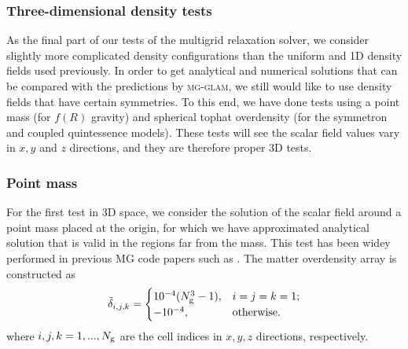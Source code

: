 \subsubsection{Three-dimensional density tests}
\label{subsubsect:3D_tests}

As the final part of our tests of the multigrid relaxation solver, we consider slightly more complicated density configurations than the uniform and 1D density fields used previously. In order to get analytical and numerical solutions that can be compared with the predictions by \textsc{mg-glam}, we still would like to use density fields that have certain symmetries. To this end, we have done tests using a point mass (for $f(R)$ gravity) and spherical tophat overdensity (for the symmetron and coupled quintessence models). These tests will see the scalar field values vary in $x, y$ and $z$ directions, and they are therefore proper 3D tests.

\subsubsection*{Point mass}

For the first test in 3D space, we consider the solution of the scalar field around a point mass placed at the origin, for which we have approximated analytical solution that is valid in the regions far from the mass. This test has been widey performed in previous MG code papers such as \citep{2008PhRvD..78l3523O,2011PhRvD..83j4026B,Li:2011_ECOSMOG_code_paper,Arnold:2019_MGAREPO_code_paper}. The matter overdensity array is constructed as
\begin{align}
    \tilde{\delta}_{i,j,k} = \begin{cases}
        10^{-4} (N_{\rm g}^3 - 1) , & i=j=k=1; \\
        -10^{-4} , & \text{otherwise.}
    \end{cases} \label{eqn:deltaijk_point_mass}
\end{align}
where $i,j,k = 1, ..., N_{\rm g}$ are the cell indices in $x,y,z$ directions, respectively.

